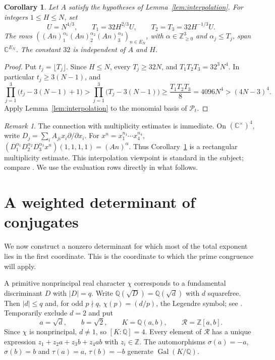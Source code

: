 \documentclass[11pt,a4paper]{amsart}
\newtheorem{corollary}[theorem]{Corollary}
\theoremstyle{remark}
\newtheorem{remark}[theorem]{Remark}
\newcommand{\Q}{\mathbb Q}
\newcommand{\Z}{\mathbb Z}
\newcommand{\C}{\mathbb C}
\newcommand{\N}{\mathbb Z_{\ge0}}
\newcommand{\cR}{\mathcal R}
\newcommand{\cP}{\mathcal P}
\DeclareMathOperator{\Gal}{Gal}
\numberwithin{equation}{section}
\begin{document}
\begin{corollary}\label{cor:rectangle}
Let $A$ satisfy the hypotheses of Lemma~\ref{lem:interpolation}.
For integers $1\le H\le N$, set
\[
 U=N^{4/3},\qquad T_1=32H^{2/3}U,
 \qquad T_2=T_3=32H^{-1/3}U.
\]
The rows $((An)_1^{\alpha_1}(An)_2^{\alpha_2}(An)_3^{\alpha_3})_{n\in E_N}$,
with $\alpha\in\N^3$ and $\alpha_j\le T_j$, span $\C^{E_N}$.
The constant $32$ is independent of $A$ and $H$.
\end{corollary}

\begin{proof}
Put $t_j=\lfloor T_j\rfloor$. Since $H\le N$, every $T_j\ge32N$,
and $T_1T_2T_3=32^3N^4$. In particular $t_j\ge3(N-1)$, and
\[
 \prod_{j=1}^3\bigl(t_j-3(N-1)+1\bigr)
 >\prod_{j=1}^3\bigl(T_j-3(N-1)\bigr)
 \ge\frac{T_1T_2T_3}{8}
 =4096N^4>(4N-3)^4.
\]
Apply Lemma~\ref{lem:interpolation} to the monomial basis of $\cP_t$.
\end{proof}

\begin{remark}
The connection with multiplicity estimates is immediate. On
$(\C^\times)^4$, write $D_j=\sum_i A_{ji}x_i\partial/\partial x_i$.
For $x^n=x_1^{n_1}\cdots x_4^{n_4}$,
$(D_1^{\alpha_1}D_2^{\alpha_2}D_3^{\alpha_3}x^n)(1,1,1,1)=(An)^\alpha$.
Thus Corollary~\ref{cor:rectangle} is a rectangular multiplicity
estimate. This interpolation viewpoint is standard in the subject;
compare \cite[Section~1]{Fischler}. We use the evaluation rows
directly in what follows.
\end{remark}

\section{A weighted determinant of conjugates}\label{sec:determinant}

We now construct a nonzero determinant for which most of the total
exponent lies in the first coordinate. This is the coordinate to
which the prime congruence will apply.

A primitive nonprincipal real character $\chi$ corresponds to a
fundamental discriminant $D$ with $|D|=q$. Write
$\Q(\sqrt D)=\Q(\sqrt d)$ with $d$ squarefree. Then
$|d|\le q$ and, for odd $p\nmid q$,
$\chi(p)=(d/p)$, the Legendre symbol; see \cite{Davenport}.
Temporarily exclude $d=2$ and put
\[
 a=\sqrt d,\qquad b=\sqrt2,\qquad K=\Q(a,b),\qquad
 \cR=\Z[a,b].
\]
Since $\chi$ is nonprincipal, $d\ne1$, so $[K:\Q]=4$.
Every element of $\cR$ has a unique expression
$z_1+z_2a+z_3b+z_4ab$ with $z_i\in\Z$.
The automorphisms $\sigma(a)=-a$, $\sigma(b)=b$ and
$\tau(a)=a$, $\tau(b)=-b$ generate $\Gal(K/\Q)$.
\end{document}
